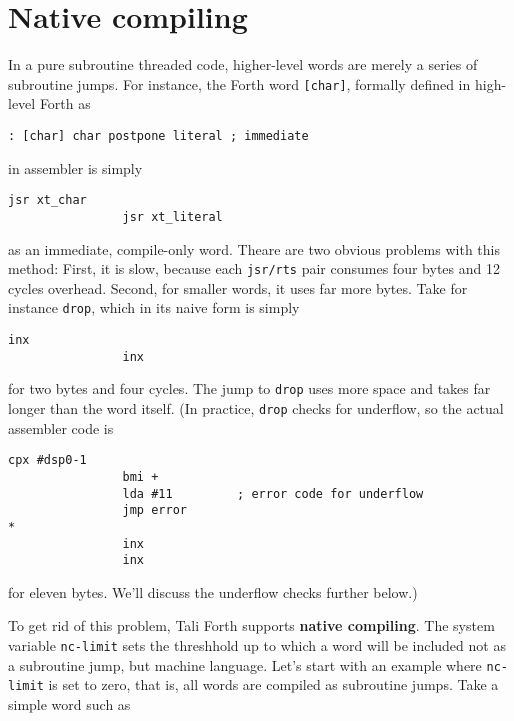 
\section{Native compiling}

In a pure subroutine threaded code, higher-level words are merely a series of
subroutine jumps. For instance, the Forth word
\texttt{[char]}, formally defined in high-level
Forth as

\begin{lstlisting}[frame=single]
        : [char] char postpone literal ; immediate
\end{lstlisting}

\noindent in assembler is simply

\begin{lstlisting}[frame=single]
                jsr xt_char
                jsr xt_literal
\end{lstlisting}

\noindent as an immediate, compile-only word. Theare are two obvious problems
with this method: First, it is slow, because each \texttt{jsr/rts} pair consumes
four bytes and 12 cycles overhead. Second, for smaller words, it uses far more
bytes. Take for instance \texttt{drop}, which in its
naive form is simply

\begin{lstlisting}[frame=single]
                inx
                inx
\end{lstlisting}

\noindent for two bytes and four cycles. The jump to \texttt{drop} uses more
space and takes far longer than the word itself. (In practice, \texttt{drop}
checks for underflow, so the actual assembler code is

\begin{lstlisting}[frame=single]
                cpx #dsp0-1
                bmi +
                lda #11         ; error code for underflow
                jmp error
*
                inx
                inx
\end{lstlisting}

\noindent for eleven bytes. We'll discuss the underflow checks further below.)

To get rid of this problem, Tali Forth supports \textbf{native
compiling}. The system variable
\texttt{nc-limit} sets
the threshhold up to which a word will be included not as a subroutine jump, but
machine language. Let's start with an example where \texttt{nc-limit} is set to
zero, that is, all words are compiled as subroutine jumps. Take a simple word
such as

